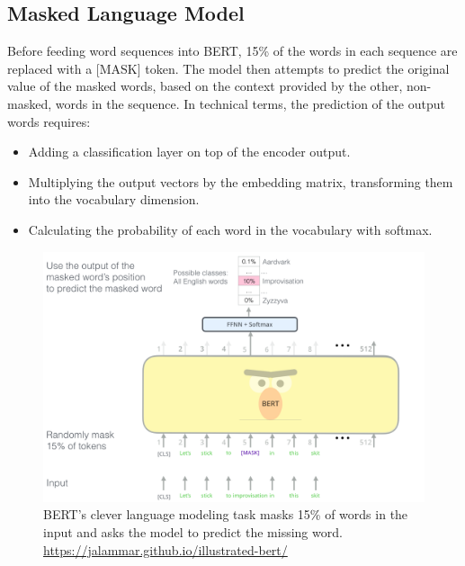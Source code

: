 \subsection{Masked Language Model}
Before feeding word sequences into BERT, 15{\%} of the words in each sequence are replaced with a [MASK] token. The model then attempts to predict the original value of the masked words, based on the context provided by the other, non-masked, words in the sequence. In technical terms, the prediction of the output words requires:
\begin{itemize}
\item Adding a classification layer on top of the encoder output.
\item Multiplying the output vectors by the embedding matrix, transforming them into the vocabulary dimension.
\item Calculating the probability of each word in the vocabulary with softmax.
\end{itemize}

\begin{figure}[h]
\centering
\includegraphics[width=1\textwidth]{BERT-language-modeling-masked-lm.png}
\caption{BERT's clever language modeling task masks 15{\%} of words in the input and asks the model to predict the missing word. \url{https://jalammar.github.io/illustrated-bert/}}
\label{fig:MLM}
\end{figure}


